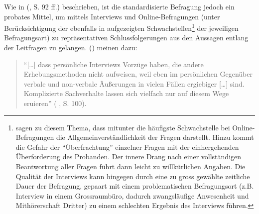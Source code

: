 \documentclass[../../main.tex]{subfiles}
\begin{document}
\begin{sloppypar}
Wie in \citeauthor{berekoven_marktforschung:_2009} (\citeyear{berekoven_marktforschung:_2009}, S. 92 ff.) beschrieben, ist die standardisierte Befragung jedoch ein probates Mittel, um mittels Interviews und Online-Befragungen (unter Berücksichtigung der ebenfalls in \citeauthor{berekoven_marktforschung:_2009} aufgezeigten Schwachstellen\footnote{\citeauthor{berekoven_marktforschung:_2009} sagen zu diesem Thema, dass mitunter die häufigste Schwachstelle bei Online-Befragungen die Allgemeinverständlichkeit der Fragen darstellt. Hinzu kommt die Gefahr der "`Überfrachtung"' einzelner Fragen mit der einhergehenden Überforderung des Probanden. Der innere Drang nach einer vollständigen Beantwortung aller Fragen führt dann leicht zu willkürlichen Angaben. Die Qualität der Interviews kann hingegen durch eine zu gross gewählte zeitliche Dauer der Befragung, gepaart mit einem problematischen Befragungsort (z.B. Interview in einem Grossraumbüro, dadurch zwangsläufige Anwesenheit und Mithörerschaft Dritter) zu einem schlechten Ergebnis des Interviews führen.} der jeweiligen Befragungsart) zu repräsentativen Schlussfolgerungen aus den Aussagen entlang der Leitfragen zu gelangen. \citeauthor{berekoven_marktforschung:_2009} (\citeyear{berekoven_marktforschung:_2009}) meinen dazu:

\begin{quote}
"`[\dots] dass persönliche Interviews Vorzüge haben, die andere Erhebungsmethoden nicht aufweisen, weil eben im persönlichen Gegenüber verbale und non-verbale Äu{\ss}erungen in vielen Fällen ergiebiger [\dots] sind. Komplizierte Sachverhalte lassen sich vielfach nur auf diesem Wege eruieren"' (\citeauthor{berekoven_marktforschung:_2009} \citeyear{berekoven_marktforschung:_2009}, S. 100).
\end{quote}
\end{sloppypar}
\end{document}
